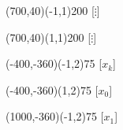 \documentclass[12pt]{article}
\begin{document}
\begin{figure}[htb]
\begin{egame}
\renewcommand{\egarrowstyle}{}

\putbranch(700,40)(-1,1){200}
\ib{}{}[$\vdots$] 

\renewcommand{\egarrowstyle}{}

\putbranch(700,40)(1,1){200}
\ib{}{}[$\vdots$] 






\renewcommand{\egarrowstyle}{}

\putbranch(-400,-360)(-1,2){75}
\ib{}{}[$x_k$]

\renewcommand{\egarrowstyle}{}

\putbranch(-400,-360)(1,2){75}
\ib{}{}[$x_0$]









\renewcommand{\egarrowstyle}{}

\putbranch(1000,-360)(-1,2){75}
\ib{}{}[$x_1$]

\renewcommand{\egarrowstyle}{}


\end{egame}
\end{figure}
\end{document}
